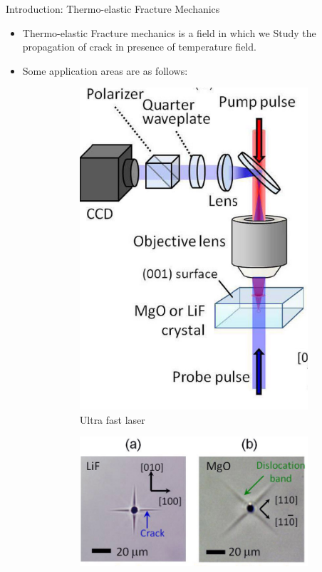 \documentclass{beamer}
\begin{document}
\begin{frame}[t,fragile]{Introduction: Thermo-elastic Fracture Mechanics}
    \vspace{-.3cm}
    \begin{itemize}
         \item Thermo-elastic Fracture mechanics is a field in which we Study the propagation of crack in presence of temperature field.
                \item Some application areas are as follows:
\begin{figure}[H]
      \begin{subfigure}{0.45\textwidth}
    \centering
    \includegraphics[scale=.1]{m}
 \vspace{-.2cm}
 \caption{\tiny Ultra fast laser}
 \end{subfigure}
\begin{subfigure}{0.45\textwidth}
    \centering
    \includegraphics[scale=.1]{l}

\end{subfigure}
\end{figure}
\end{itemize}
\end{frame}
\end{document}
